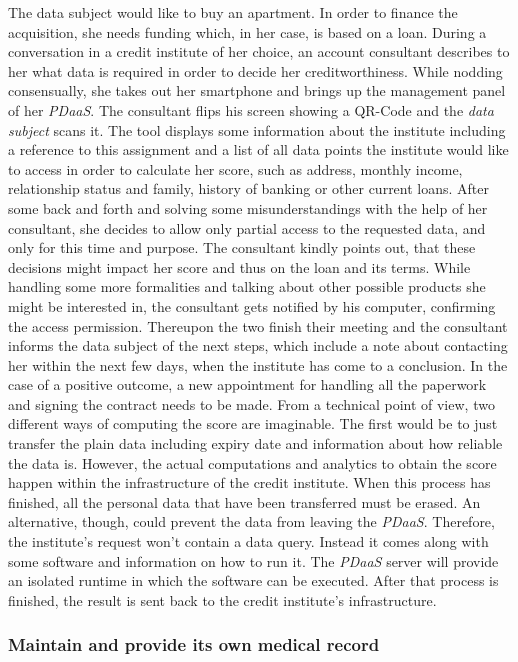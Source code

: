 \documentclass[12pt,english,a4paper,titlepage,cleardoublepage=empty,dottedtoc]{report}
\begin{document}
The data subject would like to buy an apartment. In order to finance the
acquisition, she needs funding which, in her case, is based on a loan.
During a conversation in a credit institute of her choice, an account
consultant describes to her what data is required in order to decide her
creditworthiness. While nodding consensually, she takes out her
smartphone and brings up the management panel of her \emph{PDaaS}. The
consultant flips his screen showing a QR-Code and the \emph{data
subject} scans it. The tool displays some information about the
institute including a reference to this assignment and a list of all
data points the institute would like to access in order to calculate her
score, such as address, monthly income, relationship status and family,
history of banking or other current loans. After some back and forth and
solving some misunderstandings with the help of her consultant, she
decides to allow only partial access to the requested data, and only for
this time and purpose. The consultant kindly points out, that these
decisions might impact her score and thus on the loan and its terms.
While handling some more formalities and talking about other possible
products she might be interested in, the consultant gets notified by his
computer, confirming the access permission. Thereupon the two finish
their meeting and the consultant informs the data subject of the next
steps, which include a note about contacting her within the next few
days, when the institute has come to a conclusion. In the case of a
positive outcome, a new appointment for handling all the paperwork and
signing the contract needs to be made. From a technical point of view,
two different ways of computing the score are imaginable. The first
would be to just transfer the plain data including expiry date and
information about how reliable the data is. However, the actual
computations and analytics to obtain the score happen within the
infrastructure of the credit institute. When this process has finished,
all the personal data that have been transferred must be erased. An
alternative, though, could prevent the data from leaving the
\emph{PDaaS}. Therefore, the institute's request won't contain a data
query. Instead it comes along with some software and information on how
to run it. The \emph{PDaaS} server will provide an isolated runtime in
which the software can be executed. After that process is finished, the
result is sent back to the credit institute's infrastructure.

\subsubsection*{Maintain and provide its own medical
record}\label{maintain-and-provide-its-own-medical-record}
\end{document}
